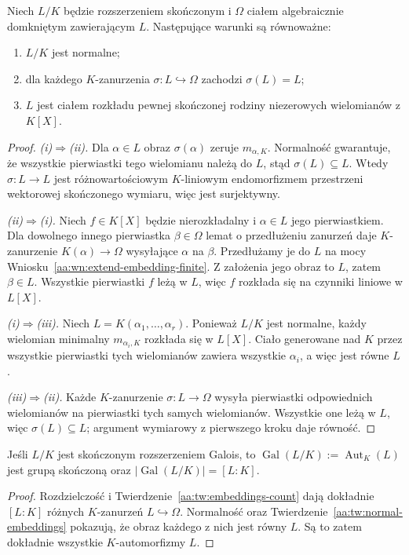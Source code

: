 \begin{twierdzenie}
\label{aa:tw:normal-embeddings}
Niech $L/K$ będzie rozszerzeniem skończonym i
$\Omega$ ciałem algebraicznie domkniętym zawierającym $L$.
Następujące warunki są równoważne:
\begin{enumerate}[label=\textup{(\roman*)}]
\item $L/K$ jest normalne;
\item dla każdego $K$-zanurzenia $\sigma:L\hookrightarrow\Omega$
      zachodzi $\sigma(L)=L$;
\item $L$ jest ciałem rozkładu pewnej skończonej rodziny
      niezerowych wielomianów z $K[X]$.
\end{enumerate}
\end{twierdzenie}
\begin{proof}
\emph{(i)$\Rightarrow$(ii).} Dla $\alpha\in L$ obraz
$\sigma(\alpha)$ zeruje $m_{\alpha,K}$.
Normalność gwarantuje, że wszystkie pierwiastki
tego wielomianu należą do $L$, stąd $\sigma(L)\subseteq L$.
Wtedy $\sigma:L\to L$ jest różnowartościowym
$K$-liniowym endomorfizmem przestrzeni wektorowej
skończonego wymiaru, więc jest surjektywny.

\emph{(ii)$\Rightarrow$(i).} Niech $f\in K[X]$ będzie
nierozkładalny i $\alpha\in L$ jego pierwiastkiem.
Dla dowolnego innego pierwiastka $\beta\in\Omega$
lemat o przedłużeniu zanurzeń daje $K$-zanurzenie
$K(\alpha)\to\Omega$ wysyłające $\alpha$ na $\beta$.
Przedłużamy je do $L$ na mocy
Wniosku~\ref{aa:wn:extend-embedding-finite}.
Z założenia jego obraz to $L$, zatem $\beta\in L$.
Wszystkie pierwiastki $f$ leżą w $L$, więc $f$
rozkłada się na czynniki liniowe w $L[X]$.

\emph{(i)$\Rightarrow$(iii).} Niech
$L=K(\alpha_1,\ldots,\alpha_r)$. Ponieważ $L/K$
jest normalne, każdy wielomian minimalny
$m_{\alpha_i,K}$ rozkłada się w $L[X]$.
Ciało generowane nad $K$ przez wszystkie pierwiastki
tych wielomianów zawiera wszystkie $\alpha_i$, a więc
jest równe $L$.

\emph{(iii)$\Rightarrow$(ii).} Każde $K$-zanurzenie
$\sigma:L\to\Omega$ wysyła pierwiastki odpowiednich
wielomianów na pierwiastki tych samych wielomianów.
Wszystkie one leżą w $L$, więc $\sigma(L)\subseteq L$;
argument wymiarowy z pierwszego kroku daje równość.
\end{proof}

\begin{twierdzenie}
\label{aa:tw:galois-group-degree}
Jeśli $L/K$ jest skończonym rozszerzeniem Galois, to
$\operatorname{Gal}(L/K):=\operatorname{Aut}_K(L)$
jest grupą skończoną oraz
$|\operatorname{Gal}(L/K)|=[L:K]$.
\end{twierdzenie}
\begin{proof}
Rozdzielczość i Twierdzenie~\ref{aa:tw:embeddings-count}
dają dokładnie $[L:K]$ różnych $K$-zanurzeń
$L\hookrightarrow\Omega$. Normalność oraz
Twierdzenie~\ref{aa:tw:normal-embeddings} pokazują,
że obraz każdego z nich jest równy $L$. Są to zatem
dokładnie wszystkie $K$-automorfizmy $L$.
\end{proof}

